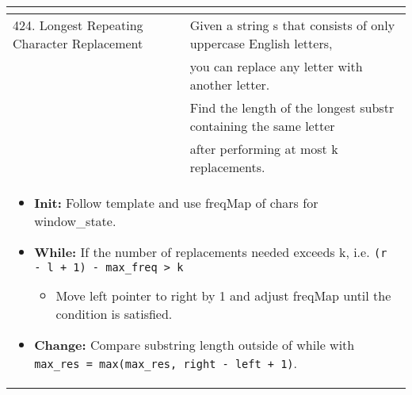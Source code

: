\begin{summary}
\begin{center}
\begin{tabular}{ll}
{\begin{itemize}
                \end{itemize}
            } \\
            \midrule
            424. Longest Repeating Character Replacement & Given a string s that consists of only uppercase English letters, \\
            & you can replace any letter with another letter. \\
            & Find the length of the longest substr containing the same letter \\
            & after performing at most k replacements. \\
            \multicolumn{2}{p{\linewidth}}{
                \begin{itemize}
                    \item \textbf{Init:} Follow template and use freqMap of chars for window\_state.
                    \item \textbf{While:} If the number of replacements needed exceeds k, i.e. \texttt{(r - l + 1) - max\_freq > k}
                    \begin{itemize}
                        \item Move left pointer to right by 1 and adjust freqMap until the condition is satisfied.
                    \end{itemize}
                    \item \textbf{Change:} Compare substring length outside of while with \texttt{max\_res = max(max\_res, right - left + 1)}.
                \end{itemize}
            } \\
            \bottomrule
        \end{tabular}
    \end{center}
\end{summary}